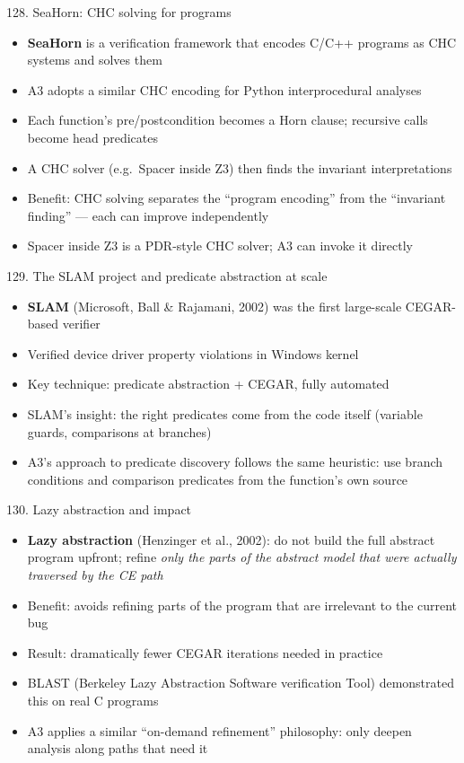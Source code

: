 \documentclass[aspectratio=169]{beamer}
\begin{document}
\begin{frame}{128. SeaHorn: CHC solving for programs}
\begin{itemize}
  \item \textbf{SeaHorn} is a verification framework that encodes C/C++ programs as CHC systems and solves them
  \item A3 adopts a similar CHC encoding for Python interprocedural analyses
  \item Each function's pre/postcondition becomes a Horn clause; recursive calls become head predicates
  \item A CHC solver (e.g.\ Spacer inside Z3) then finds the invariant interpretations
  \item Benefit: CHC solving separates the ``program encoding'' from the ``invariant finding'' --- each can improve independently
  \item Spacer inside Z3 is a PDR-style CHC solver; A3 can invoke it directly
\end{itemize}
\end{frame}

\begin{frame}{129. The SLAM project and predicate abstraction at scale}
\begin{itemize}
  \item \textbf{SLAM} (Microsoft, Ball \& Rajamani, 2002) was the first large-scale CEGAR-based verifier
  \item Verified device driver property violations in Windows kernel
  \item Key technique: predicate abstraction + CEGAR, fully automated
  \item SLAM's insight: the right predicates come from the code itself (variable guards, comparisons at branches)
  \item A3's approach to predicate discovery follows the same heuristic: use branch conditions and comparison predicates from the function's own source
\end{itemize}
\end{frame}

\begin{frame}{130. Lazy abstraction and impact}
\begin{itemize}
  \item \textbf{Lazy abstraction} (Henzinger et al., 2002): do not build the full abstract program upfront;
    refine \emph{only the parts of the abstract model that were actually traversed by the CE path}
  \item Benefit: avoids refining parts of the program that are irrelevant to the current bug
  \item Result: dramatically fewer CEGAR iterations needed in practice
  \item BLAST (Berkeley Lazy Abstraction Software verification Tool) demonstrated this on real C programs
  \item A3 applies a similar ``on-demand refinement'' philosophy: only deepen analysis along paths that need it
\end{itemize}
\end{frame}
\end{document}
